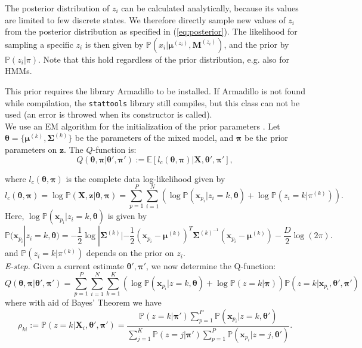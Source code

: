 \documentclass[a4paper,11pt]{article}
\def\M{\boldsymbol{M}}
\def\X{\boldsymbol{X}}
\def\x{\boldsymbol{x}}
\def\z{\boldsymbol{z}}
\def\bmu{\boldsymbol{\mu}}
\def\bpi{\boldsymbol{\pi}}
\def\btheta{\boldsymbol{\theta}}
\def\bSigma{\boldsymbol{\Sigma}}
\def\p{\mathbb{P}}
\def\stattools{\texttt{stattools}}
\begin{document}
The posterior distribution of $z_i$ can be calculated analytically, because its values are limited to few discrete states. We therefore directly sample new values of $z_i$ from the posterior distribution as specified in (\ref{eq:posterior}). The likelihood for sampling a specific $z_i$ is then given by $\p(x_i | \bmu^{(z_i)}, \M^{(z_i)})$, and the prior by $\p(z_i | \pi )$. Note that this hold regardless of the prior distribution, e.g. also for HMMs.

This prior requires the library Armadillo to be installed. If Armadillo is not found while compilation, the \stattools{} library still compiles, but this class can not be used (an error is throwed when its constructor is called).\\
We use an EM algorithm for the initialization of the prior parameters \label{pg:EM_multivariate}. Let $\btheta = \{\bmu^{(k)}, \bSigma^{(k)}\}$ be the parameters of the mixed model, and $\bpi$ be the prior parameters on $\z$. The $Q$-function is:
\begin{equation*}
 Q(\btheta, \bpi  | \btheta', \bpi') := \mathbb{E} \left[ l_c(\btheta, \bpi) \Big| \X, \btheta', \bpi' \right],
\end{equation*}

where $l_c(\btheta, \bpi)$ is the complete data log-likelihood given by
\begin{equation*}
 l_c(\btheta, \bpi) = \log \p(\X, \z | \btheta, \bpi) = \sum_{p=1}^P \sum_{i=1}^N \left( \log \p(\x_{p_i} | z_i = k, \btheta) + \log \p(z_i = k | \pi^{(k)}) \right).
\end{equation*}
Here, $\log \p(\x_{p_i} | z_i = k, \btheta)$ is given by
\begin{equation*}
 \p(\x_{p_i} | z_i = k, \btheta) = -\frac{1}{2}\log |{\bSigma^{(k)}}| - \frac{1}{2}(\x_{p_i} - \bmu^{(k)})^T \bSigma^{{(k)}^{-1}} (\x_{p_i} - \bmu^{(k)}) - \frac{D}{2}\log(2\pi).
\end{equation*}
and $\p(z_i = k| \pi^{(k)})$ depends on the prior on $z_i$.\\
{\it E-step.} Given a current estimate $\btheta', \bpi'$, we now determine the Q-function:
\begin{equation*}
Q(\btheta, \bpi  | \btheta', \bpi') =\sum_{p=1}^P \sum_{i=1}^N \sum_{k=1}^K \left(\log \p(\x_{p_i} | z = k, \btheta) + \log \p(z = k | \bpi)\right) \p(z = k | \x_{p_i}, \btheta', \bpi')
\end{equation*}
where with aid of Bayes' Theorem we have
\begin{equation}\label{eq:P_gamma_multi}
\rho_{ki}:=\p(z = k | \X_{i}, \btheta', \bpi') = \frac{\p(z = k | \bpi')\sum_{p=1}^P\p(\x_{p_i} | z = k,  \btheta')}{\sum_{j=1}^K \p(z = j | \bpi') \sum_{p=1}^P \p(\x_{p_i} | z=j,  \btheta') }.
\end{equation}
\end{document}
